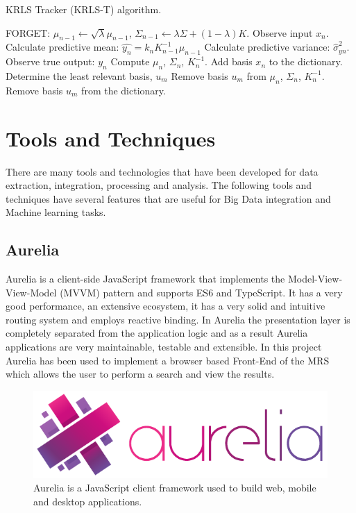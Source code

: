 \begin{algorithm}
	\caption{KRLS Tracker (KRLS-T) algorithm.}
	\label{Literature Review:KRLS-T}
	\begin{algorithmic}
		\STATE FORGET: \(\mu_{n-1} \leftarrow \sqrt{\lambda} \mu_{n-1}\), \(\Sigma_{n-1} \leftarrow \lambda \Sigma + (1 - \lambda) K\).
		\STATE Observe input \(x_{n}\).
		\STATE Calculate predictive mean: \(\hat{y_{n}}=k_{n} K_{n-1}^{-1} \mu_{n-1}\)
		\STATE Calculate predictive variance: \(\hat{\sigma}^{2}_{yn}\).
		\STATE Observe true output: \(y_{n}\)
		Compute \(\mu_{n}\), \(\Sigma_{n}\), \(K_{n}^{-1}\).
		\STATE Add basis \(x_{n}\) to the dictionary.
		\STATE Determine the least relevant basis, \(u_{m}\)
		\STATE Remove basis \(u_{m}\) from \(\mu_{n}\), \(\Sigma_{n}\), \(K_{n}^{-1}\).
		\STATE Remove basis \(u_{m}\) from the dictionary.
		\ENDIF
		\ENDFOR
	\end{algorithmic}
\end{algorithm}

\newpage
\section{Tools and Techniques}

There are many tools and technologies that have been  developed for data extraction, integration, processing and analysis. The following tools and techniques have several features that are useful for Big Data integration and Machine learning tasks.

\subsection{Aurelia}
Aurelia is a client-side JavaScript framework that implements the Model-View-View-Model (MVVM) pattern and supports ES6 and TypeScript. It has a very good performance, an extensive ecosystem, it has a very solid and intuitive routing system and employs reactive binding. In Aurelia the presentation layer is completely separated from the application logic and as a result Aurelia applications are very maintainable, testable and extensible. In this project Aurelia has been used to implement a browser based Front-End of the \ac{MRS} which allows the user to perform a search and view the results.

\begin{figure}[H]
	\centering
	\includegraphics[scale=0.45]{img/aurelia.png}
	\caption{Aurelia is a JavaScript client framework used to build web, mobile and desktop applications.}
	\label{Literature Review:Aurelia}
\end{figure} 

